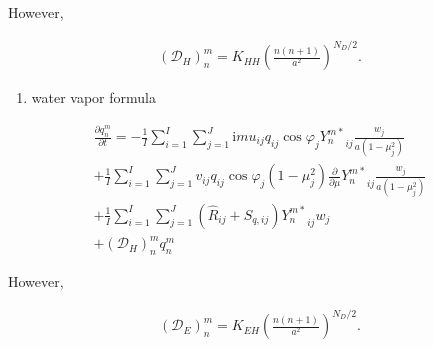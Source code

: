 However,

\begin{eqnarray}
({\mathcal D}_H)_n^m
   =  K_{HH} \left( \frac{n(n+1)}{a^{2}} \right)^{N_D/2} .
\end{eqnarray}

\begin{enumerate}
\def\labelenumi{\arabic{enumi}.}
\setcounter{enumi}{3}
\tightlist
\item
  water vapor formula
\end{enumerate}

\begin{eqnarray}
  \frac{\partial{q_n^m}}{\partial {t}}
   =  - \frac{1}{I} \sum_{i=1}^{I} \sum_{j=1}^{J}  
          \mathrm{i}m u_{ij} q_{ij} \cos\varphi_j
          {Y_n^{m *}}_{ij} \frac{w_j}{a(1-\mu_j^{2})}
          \\
     + \frac{1}{I} \sum_{i=1}^{I} \sum_{j=1}^{J}  
          v_{ij} q_{ij} \cos\varphi_j
          (1-\mu_j^2)
          \frac{\partial }{\partial \mu} {Y_n^{m *}}_{ij}
          \frac{w_j}{a(1-\mu_j^{2})}
          \\
     + \frac{1}{I} \sum_{i=1}^{I} \sum_{j=1}^{J}  
          \left( \hat{R}_{ij} + S_{q,ij} \right)
          {Y_n^{m *}}_{ij} w_j
          \\
     + ({\mathcal D}_H)_n^m q_n^m
\end{eqnarray}

However,

\begin{eqnarray}
({\mathcal D}_E)_n^m
   =  K_{EH} \left( \frac{n(n+1)}{a^{2}} \right)^{N_D/2} .
\end{eqnarray}
